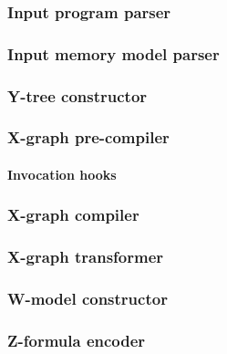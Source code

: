 \subsubsection{Input program parser}
\label{ch:impl:proc:inp-prog-parser}


\subsubsection{Input memory model parser}
\label{ch:impl:proc:inp-mod-parser}

\subsubsection{Y-tree constructor}
\label{ch:impl:proc:y-constr}

\subsubsection{X-graph pre-compiler}
\label{ch:impl:proc:x-pre-compiler}

\paragraph{Invocation hooks}
\label{ch:impl:proc:x-pre-compiler:hooks}

\subsubsection{X-graph compiler}
\label{ch:impl:proc:x-compiler}

\subsubsection{X-graph transformer}
\label{ch:impl:proc:x-transf}

\subsubsection{W-model constructor}
\label{ch:impl:proc:w-constr}

\subsubsection{Z-formula encoder}
\label{ch:impl:proc:z-encoder}



